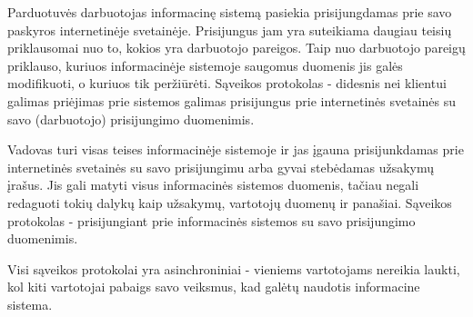 \documentclass{VUMIFPSkursinis}
\begin{document}
Parduotuvės darbuotojas informacinę sistemą pasiekia prisijungdamas prie savo paskyros internetinėje svetainėje. Prisijungus jam yra suteikiama daugiau teisių priklausomai nuo to, kokios yra darbuotojo pareigos. Taip nuo darbuotojo pareigų priklauso, kuriuos informacinėje sistemoje saugomus duomenis jis galės modifikuoti, o kuriuos tik peržiūrėti. Sąveikos protokolas - didesnis nei klientui galimas priėjimas prie sistemos galimas prisijungus prie internetinės svetainės su savo (darbuotojo) prisijungimo duomenimis.

Vadovas turi visas teises informacinėje sistemoje ir jas įgauna prisijunkdamas prie internetinės svetainės su savo prisijungimu arba gyvai stebėdamas užsakymų įrašus. Jis gali matyti visus informacinės sistemos duomenis, tačiau negali redaguoti tokių dalykų kaip užsakymų, vartotojų duomenų ir panašiai.  Sąveikos protokolas - prisijungiant prie informacinės sistemos su savo prisijungimo duomenimis.

Visi sąveikos protokolai yra asinchroniniai - vieniems vartotojams nereikia laukti, kol kiti vartotojai pabaigs savo veiksmus, kad galėtų naudotis informacine sistema.

\newpage
\end{document}
